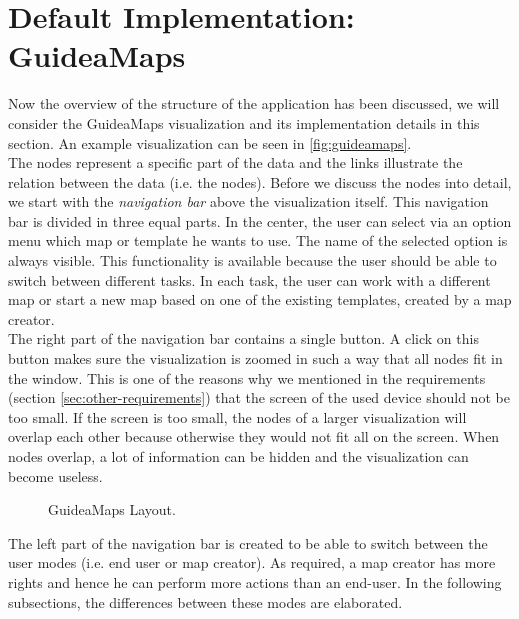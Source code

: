 \section{Default Implementation: GuideaMaps}
Now the overview of the structure of the application has been discussed, we will consider the GuideaMaps visualization and its implementation details in this section. An example visualization can be seen in \autoref{fig:guideamaps}.\\

The nodes represent a specific part of the data and the links illustrate the relation between the data (i.e. the nodes). Before we discuss the nodes into detail, we start with the \textit{navigation bar} above the visualization itself. This navigation bar is divided in three equal parts. In the center, the user can select via an option menu which map or template he wants to use. The name of the selected option is always visible. This functionality is available because the user should be able to switch between different tasks. In each task, the user can work with a different map or start a new map based on one of the existing templates, created by a map creator.\\

The right part of the navigation bar contains a single button. A click on this button makes sure the visualization is zoomed in such a way that all nodes fit in the window. This is one of the reasons why we mentioned in the requirements (section \ref{sec:other-requirements}) that the screen of the used device should not be too small. If the screen is too small, the nodes of a larger visualization will overlap each other because otherwise they would not fit all on the screen. When nodes overlap, a lot of information can be hidden and the visualization can become useless.

\begin{figure}[h]
	\centering
	\caption{GuideaMaps Layout.}
	\label{fig:guideamaps}
\end{figure}

The left part of the navigation bar is created to be able to switch between the user modes (i.e. end user or map creator). As required, a map creator has more rights and hence he can perform more actions than an end-user. In the following subsections, the differences between these modes are elaborated.





